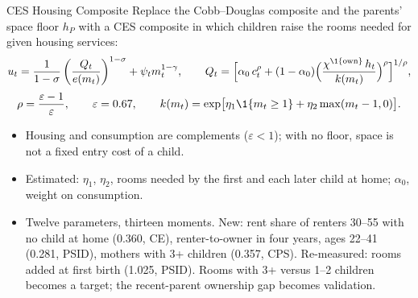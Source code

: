 \begin{frame}[label=ces-appendix]{CES Housing Composite}
\footnotesize
\setlength{\abovedisplayskip}{3pt}\setlength{\belowdisplayskip}{3pt}
Replace the Cobb--Douglas composite and the parents' space floor $h_P$ with a CES composite in which children raise the rooms needed for given housing services:
\[
u_t=\frac{1}{1-\sigma}\left(\frac{Q_t}{e(m_t)}\right)^{1-\sigma}+\psi_t m_t^{1-\gamma},\qquad
Q_t=\Bigl[\alpha_0\,c_t^{\rho}+(1-\alpha_0)\Bigl(\frac{\chi^{\1\{\mathrm{own}\}}\,h_t}{k(m_t)}\Bigr)^{\rho}\Bigr]^{1/\rho},
\]
\[
\rho=\frac{\varepsilon-1}{\varepsilon},\qquad \varepsilon=0.67,\qquad
k(m_t)=\exp\bigl[\eta_1\1\{m_t\ge1\}+\eta_2\max(m_t-1,0)\bigr].
\]
\begin{itemize}\setlength\itemsep{2pt}
  \item Housing and consumption are complements ($\varepsilon<1$); with no floor, space is not a fixed entry cost of a child.
  \item Estimated: $\eta_1$, $\eta_2$, rooms needed by the first and each later child at home; $\alpha_0$, weight on consumption.
  \item Twelve parameters, thirteen moments. New: rent share of renters 30--55 with no child at home (0.360, CE), renter-to-owner in four years, ages 22--41 (0.281, PSID), mothers with 3+ children (0.357, CPS). Re-measured: rooms added at first birth (1.025, PSID). Rooms with 3+ versus 1--2 children becomes a target; the recent-parent ownership gap becomes validation.
  \end{itemize}
\end{frame}

